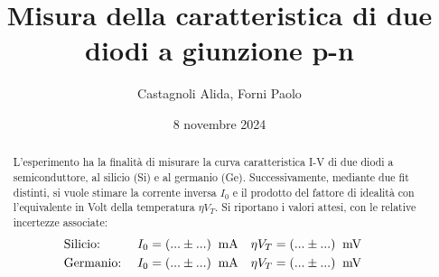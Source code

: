 \documentclass[11pt]{article}
\begin{document}

\title{\textbf{Misura della caratteristica di due diodi a giunzione p-n}}
\author{Castagnoli Alida, Forni Paolo}
\date{8 novembre 2024}
\maketitle


\vspace{-23pt}  %

\begin{abstract}
    L'esperimento ha la finalità di misurare la curva caratteristica \mbox{I-V} di due diodi a semiconduttore, al silicio (Si) e al germanio (Ge).
    Successivamente, mediante due fit distinti, si vuole stimare la corrente inversa $I_{0}$ e il prodotto del fattore di idealità con l'equivalente in Volt della temperatura $\eta V_{T}$.  
    Si riportano i valori attesi, con le relative incertezze associate:
    \vspace{-1pt}
    \begin{align*}
        &\textnormal{Silicio:} \;
        &I_{0} &= (... \pm ...) \;\;\textnormal{mA} &
        \eta V_{T} &= (... \pm ...)\;\;\textnormal{mV} & \\
        &\textnormal{Germanio:} \;
        &I_{0} &= (... \pm ...) \;\;\textnormal{mA} &
        \eta V_{T} &= (... \pm ...)\;\;\textnormal{mV} &
    \end{align*}

\end{abstract}
% 



\end{document}
